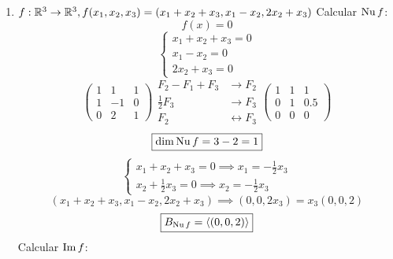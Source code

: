 \documentclass[../practica.root.tex]{subfiles}
\begin{document}
\begin{enumerate}
          \begin{enumerate}
              \item \( f : \mathbb{R}^3 \to \mathbb{R}^3, f(x_1,x_2,x_3) = (x_1 + x_2 + x_3, x_1 - x_2, 2x_2 + x_3) \)
                    Calcular \(\operatorname{Nu} f\):
                    \[ f(x) = 0 \]
                    \[
                        \begin{cases}
                            x_1 + x_2 + x_3 = 0 \\
                            x_1 - x_2 = 0       \\
                            2x_2 + x_3 = 0
                        \end{cases}
                    \] \[
                        \begin{pmatrix}
                            1 & 1  & 1 \\
                            1 & -1 & 0 \\
                            0 & 2  & 1
                        \end{pmatrix}
                        \begin{array}{rl}
                            F_2 - F_1 + F_3 & \to F_2             \\
                            \frac{1}{2}F_3  & \to F_3             \\
                            F_2             & \leftrightarrow F_3
                        \end{array}
                        \begin{pmatrix}
                            1 & 1 & 1   \\
                            0 & 1 & 0.5 \\
                            0 & 0 & 0
                        \end{pmatrix}
                    \] \[
                        \boxed{\dim\operatorname{Nu}{f} = 3 - 2 = 1}
                    \] \[
                        \begin{cases}
                            x_1 + x_2 + x_3 = 0 \implies x_1 = -\frac{1}{2}x_3 \\
                            x_2 + \frac{1}{2}x_3 = 0 \implies x_2 = -\frac{1}{2}x_3
                        \end{cases}
                    \] \[
                        (x_1 + x_2 + x_3, x_1 - x_2, 2x_2 + x_3) \implies (0, 0, 2x_3) = x_3(0, 0, 2)
                    \] \[
                        \boxed{B_{\operatorname{Nu} f} = \langle(0,0,2)\rangle}
                    \]
                    Calcular \(\operatorname{Im} f\):

\end{enumerate}
\end{enumerate}
\end{document}
